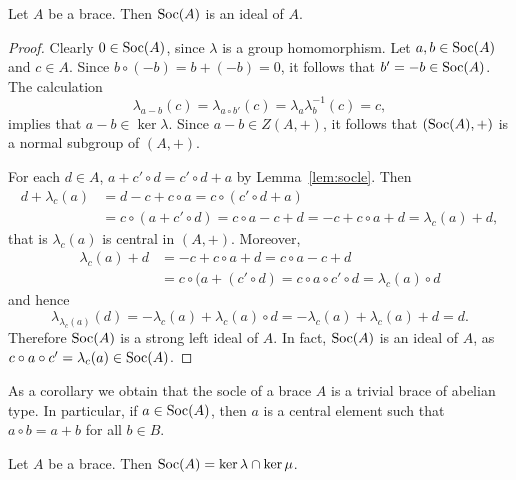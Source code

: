 \begin{proposition}
	\label{pro:socle}
	Let $A$ be a brace. Then $\operatorname{Soc}(A)$ is an ideal of $A$.
	
	\begin{proof}
		Clearly $0\in\operatorname{Soc}(A)$, since $\lambda$ is a group homomorphism. Let $a,b\in\operatorname{Soc}(A)$ and $c\in A$. Since 
		$b\circ (-b)=b+(-b)=0$, it follows that 
		$b'=-b\in\operatorname{Soc}(A)$. The calculation 
		\[
		\lambda_{a-b}(c)=\lambda_{a\circ b'}(c)=\lambda_a\lambda^{-1}_b(c)=c,
		\]
 		implies that $a-b\in\ker\lambda$. Since $a-b\in Z(A,+)$, it follows that 
        $(\operatorname{Soc}(A),+)$ is a normal subgroup of $(A,+)$. 
        
        For each $d\in A$, $a+c'\circ d=c'\circ d+a$ by Lemma~\ref{lem:socle}. Then 
        \begin{align*}
        d+\lambda_c(a) &= d-c+c\circ a
        =c\circ (c'\circ d+a)\\
        &= c\circ (a+c'\circ d)
        = c\circ a-c+d
        = -c+c\circ a+d
        = \lambda_c(a)+d,
        \end{align*}
        that is $\lambda_c(a)$ is central in $(A,+)$. Moreover, 
        \begin{align*}
            \lambda_c(a)+d &= -c+c\circ a+d 
            = c\circ a-c+d\\
            &= c\circ (a+(c'\circ d)
            = c\circ a\circ c'\circ d=\lambda_c(a)\circ d
        \end{align*}
        and hence 
        \[
        \lambda_{\lambda_c(a)}(d)=-\lambda_c(a)+\lambda_c(a)\circ d=-\lambda_c(a)+\lambda_c(a)+d=d.
        \]
        Therefore $\operatorname{Soc}(A)$ is a strong left ideal of $A$. In fact, $\operatorname{Soc}(A)$ is an ideal of $A$,
        as $c\circ a\circ c'=\lambda_c(a)\in\operatorname{Soc}(A)$.  
	\end{proof}
\end{proposition}

As a corollary we obtain that the socle of a brace $A$ is a trivial brace of abelian type. 
In particular, if $a\in\operatorname{Soc}(A)$, then $a$ is a central element such that  
$a\circ b=a+b$ for all $b\in B$. 

\begin{proposition}
    \label{pro:soc_kernels}
    Let $A$ be a brace. Then $\operatorname{Soc}(A)=\ker\lambda\cap\ker\mu$.
\end{proposition}

